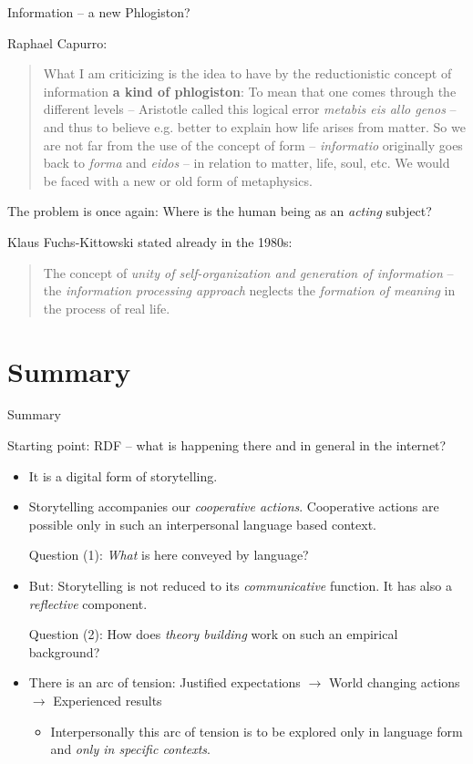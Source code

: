 \documentclass{beamer}
\begin{document}
\begin{frame}{Information -- a new Phlogiston?}

Raphael Capurro:\vfill
\begin{quote}\small
  What I am criticizing is the idea to have by the reductionistic concept of
  information \textbf{a kind of phlogiston}: To mean that one comes through
  the different levels -- Aristotle called this logical error \emph{metabis
    eis allo genos} -- and thus to believe e.g. better to explain how life
  arises from matter. So we are not far from the use of the concept of form --
  \emph{informatio} originally goes back to \emph{forma} and \emph{eidos} --
  in relation to matter, life, soul, etc. We would be faced with a new or old
  form of metaphysics.
\end{quote}

The problem is once again: Where is the human being as an \emph{acting}
subject?

Klaus Fuchs-Kittowski stated already in the 1980s: \vfill
\begin{quote}\small
  The concept of \emph{unity of self-organization and generation of
    information} -- the \emph{information processing approach} neglects the
  \emph{formation of meaning} in the process of real life.
\end{quote}\vspace*{1em}
\end{frame}

\section{Summary}
\begin{frame}{Summary}\small

Starting point: RDF -- what is happening there and in general in the internet?
\begin{itemize}
\item It is a digital form of storytelling.
\item Storytelling accompanies our \emph{cooperative actions}. Cooperative
  actions are possible only in such an interpersonal language based context.
  
  Question (1): \emph{What} is here conveyed by language?
\item But: Storytelling is not reduced to its \emph{communicative} function.
  It has also a \emph{reflective} component.

  Question (2): How does \emph{theory building} work on such an empirical
  background?
\item There is an arc of tension: Justified expectations $\to$ World changing
  actions $\to$ Experienced results
  \begin{itemize}
  \item Interpersonally this arc of tension is to be explored only
    in language form and \emph{only in specific contexts}.
  \end{itemize}
\end{itemize}
\end{frame}
\end{document}
